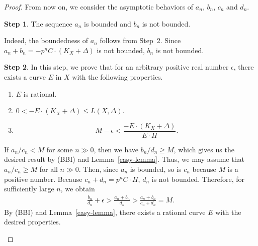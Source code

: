 \documentclass[12pt,twoside]{amsart}
\theoremstyle{definition}
\newtheorem{step}{Step}
\begin{document}
\begin{proof}
From now on, 
we consider the asymptotic behaviors of $a_n$, $b_n$, $c_n$ and $d_n$.

\begin{step}
The sequence $a_n$ is bounded and $b_n$ is not bounded. 

Indeed, the boundedness of $a_n$ follows from Step~2. 
Since $a_n+b_n=-p^nC\cdot (K_X+\Delta)$ is not bounded, 
$b_n$ is not bounded. 
\end{step}

\begin{step}
In this step, we prove that for 
an arbitrary positive real number $\epsilon$, 
there exists a curve $E$ in $X$ with the following properties. 
\begin{enumerate}
\item[$(1)'$]{$E$ is rational.}
\item[$(2)'$]{$0<-E\cdot (K_X+\Delta)\leq L(X, \Delta)$.}
\item[$(3)'$]{$$M-\epsilon<\frac{-E\cdot (K_X+\Delta)}{E\cdot H}.$$}
\end{enumerate}

If ${a_n}/{c_n}<M$ for some $n \gg 0$, then we have ${b_n}/{d_n}\geq M$, 
which gives us the desired result by (BBI) and Lemma~\ref{easy-lemma}. 
Thus, we may assume that ${a_n}/{c_n}\geq M$ 
for all $n \gg 0$.
Then, since $a_n$ is bounded, 
so is $c_n$ because $M$ is a positive number. 
Because $c_n+d_n=p^nC\cdot H$, 
$d_n$ is not bounded. 
Therefore, for sufficiently large $n$, we obtain 
\begin{eqnarray*}
\frac{b_n}{d_n}+\epsilon>\frac{a_n+b_n}{d_n}>\frac{a_n+b_n}{c_n+d_n}=M. 
\end{eqnarray*}
By (BBI) and Lemma~\ref{easy-lemma}, there exists a rational curve $E$ with the desired properties. 
\end{step}


\end{proof}
\end{document}
